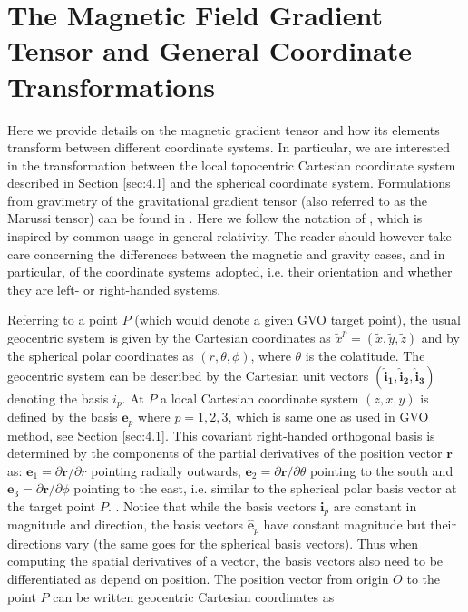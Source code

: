 \documentclass[extra,mreferee]{gji}
\begin{document}
\section{The Magnetic Field Gradient Tensor and General Coordinate Transformations}
\label{app:A}
Here we provide details on the magnetic gradient tensor and how its elements transform between different coordinate systems. In particular, we are interested in the transformation between the local topocentric Cartesian coordinate system described in Section \ref{sec:4.1} and the spherical  coordinate system. Formulations from gravimetry of the gravitational gradient tensor (also referred to as the Marussi tensor) can be found in \cite{Reed_1973,Koop_1993,Casotto_Fantino_2009,Tscherning_1976}. Here we follow the notation of \cite{Casotto_Fantino_2009}, which is inspired by common usage in general relativity. The reader should however take care concerning the differences between the magnetic and gravity cases, and in particular, of the coordinate systems adopted, i.e. their orientation and whether they are left- or right-handed systems. 

Referring to a point $P$ (which would denote a given GVO target point), the usual geocentric system is given by the Cartesian coordinates as $\tilde{x}^p=(\tilde{x},\tilde{y},\tilde{z})$ and by the spherical polar coordinates as $(r,\theta,\phi)$, where $\theta$ is the colatitude. The geocentric system can be described by the Cartesian unit vectors $(\mathbf{\hat{i}_1},\mathbf{\hat{i}_2},\mathbf{\hat{i}_3})$ denoting the basis $i_p$. At $P$ a local Cartesian coordinate system $(z,x,y)$ is defined by the basis $\mathbf{e}_p$ where $p=1,2,3$, which is same one as used in GVO method, see Section \ref{sec:4.1}. This covariant right-handed orthogonal basis is determined by the components of the partial derivatives of the position vector $\mathbf{r}$ as: $\mathbf{e}_1=\partial \mathbf{r} / \partial r$ pointing radially outwards, $\mathbf{e}_2=\partial \mathbf{r} / \partial \theta$ pointing to the south and $\mathbf{e}_3=\partial \mathbf{r} / \partial \phi$ pointing to the east, i.e. similar to the spherical polar basis vector at the target point $P$. . Notice that while the basis vectors $\mathbf{i}_p$ are constant in magnitude and direction, the basis vectors $\hat{\mathbf{e}}_p$ have constant magnitude but their directions vary (the same goes for the spherical basis vectors). Thus when computing the spatial derivatives of a vector, the basis vectors also need to be differentiated as  depend on position. The position vector from origin $O$ to the point $P$ can be written  geocentric Cartesian coordinates as \citep{Riley_etal_2004}
\end{document}
